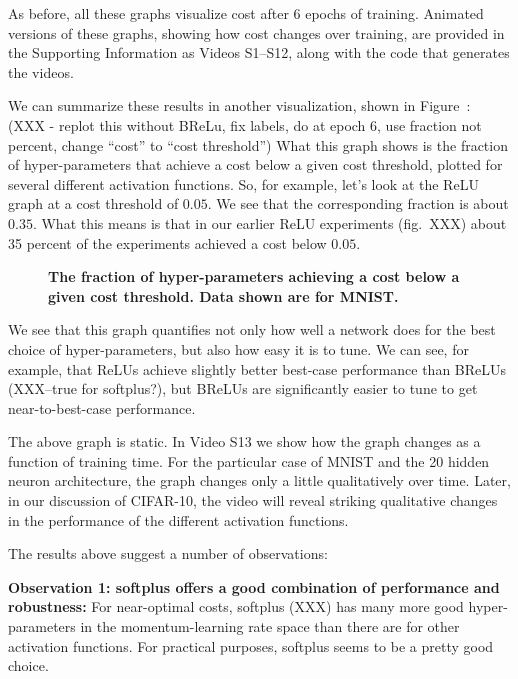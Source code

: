 \documentclass[10pt]{article}
\begin{document}
As before, all these graphs visualize cost after 6 epochs of
training. Animated versions of these graphs, showing how cost changes
over training, are provided in the Supporting Information as Videos
S1--S12, along with the code that generates the videos.

We can summarize these results in another visualization, shown in
Figure~\label{fig:fraction}: (XXX - replot this without BReLu, fix
labels, do at epoch 6, use fraction not percent, change ``cost'' to
``cost threshold'') What this graph shows is the fraction of
hyper-parameters that achieve a cost below a given cost threshold,
plotted for several different activation functions.  So, for example,
let's look at the ReLU graph at a cost threshold of $0.05$.  We see
that the corresponding fraction is about $0.35$.  What this means is
that in our earlier ReLU experiments (fig.~XXX) about 35 percent of
the experiments achieved a cost below $0.05$.

\begin{figure}[!ht]
\begin{center}
\end{center}
\caption{ {\bf The fraction of hyper-parameters achieving a cost below
    a given cost threshold. Data shown are for MNIST.}}
\label{fig:fraction}
\end{figure}

We see that this graph quantifies not only how well a network does for
the best choice of hyper-parameters, but also how easy it is to tune.
We can see, for example, that ReLUs achieve slightly better best-case
performance than BReLUs (XXX--true for softplus?), but BReLUs are
significantly easier to tune to get near-to-best-case performance.

The above graph is static.  In Video S13 we show how the graph changes
as a function of training time.  For the particular case of MNIST and
the 20 hidden neuron architecture, the graph changes only a little
qualitatively over time.  Later, in our discussion of CIFAR-10, the
video will reveal striking qualitative changes in the performance of
the different activation functions.

The results above suggest a number of observations:

\textbf{Observation 1: softplus offers a good combination of
  performance and robustness:} For near-optimal costs, softplus (XXX)
has many more good hyper-parameters in the momentum-learning rate
space than there are for other activation functions.  For practical
purposes, softplus seems to be a pretty good choice.
\end{document}
